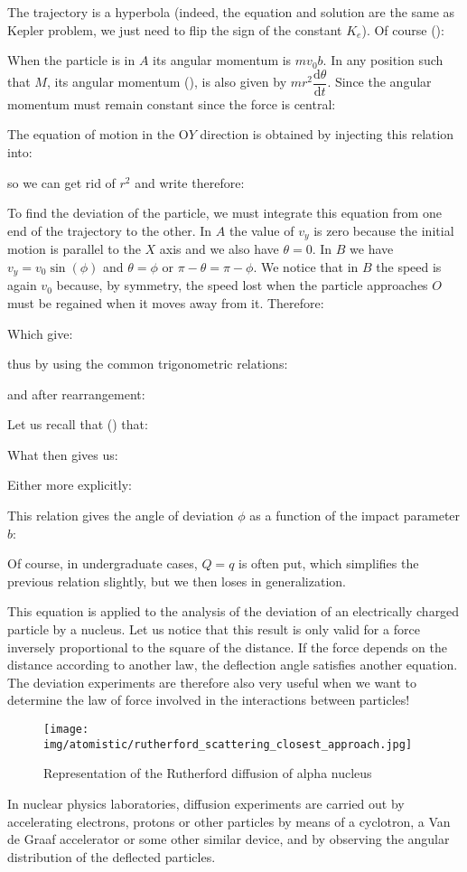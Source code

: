 	The trajectory is a hyperbola (indeed, the equation and solution are the same as Kepler problem, we just need to flip the sign of the constant $K_e$). Of course ():
	
	When the particle is in $A$ its angular momentum is $mv_0b$. In any position such that $M$, its angular momentum (), is also given by $mr^2\dfrac{\mathrm{d}\theta}{\mathrm{d}t}$. Since the angular momentum must remain constant since the force is central:
	
	The equation of motion in the O$Y$ direction is obtained by injecting this relation into:
	
	so we can get rid of $r^2$ and write therefore:
	
	To find the deviation of the particle, we must integrate this equation from one end of the trajectory to the other. In $A$ the value of $v_y$ is zero because the initial motion is parallel to the $X$ axis and we also have $\theta=0$. In $B$ we have $v_y=v_0\sin(\phi)$ and $\theta=\phi$ or $\pi-\theta=\pi-\phi$. We notice that in $B$ the speed is again $v_0$ because, by symmetry, the speed lost when the particle approaches $O$ must be regained when it moves away from it. Therefore:
	
	Which give:
	
	thus by using the common trigonometric relations:
	
	and after rearrangement:
	
	Let us recall that () that:
	
	What then gives us:
	
	Either more explicitly:
	
	This relation gives the angle of deviation $\phi$ as a function of the impact parameter $b$:
	
	Of course, in undergraduate cases, $Q = q$ is often put, which simplifies the previous relation slightly, but we then loses in generalization.
	
	This equation is applied to the analysis of the deviation of an electrically charged particle by a nucleus. Let us notice that this result is only valid for a force inversely proportional to the square of the distance. If the force depends on the distance according to another law, the deflection angle satisfies another equation. The deviation experiments are therefore also very useful when we want to determine the law of force involved in the interactions between particles!
	\begin{figure}[H]
		\centering
		\texttt{[image: img/atomistic/rutherford\_scattering\_closest\_approach.jpg]}
		\caption{Representation of the Rutherford diffusion of alpha nucleus}
	\end{figure}
	In nuclear physics laboratories, diffusion experiments are carried out by accelerating electrons, protons or other particles by means of a cyclotron, a Van de Graaf accelerator or some other similar device, and by observing the angular distribution of the deflected particles.

